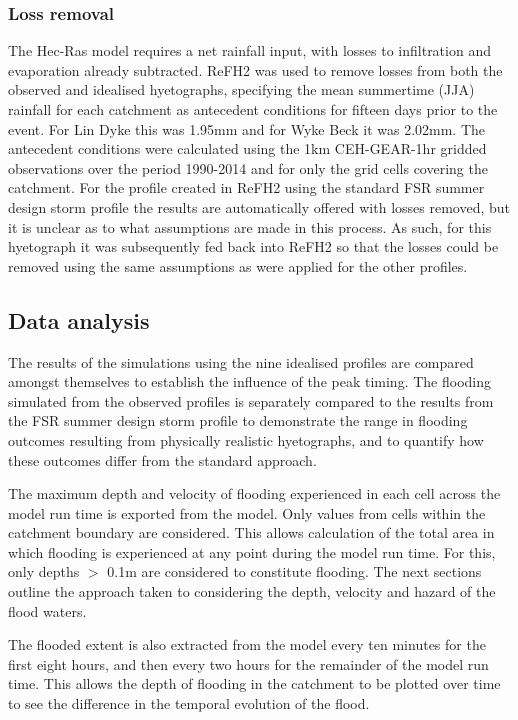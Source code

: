 \documentclass[APA,Times2COL]{WileyNJDv5}
\begin{document}
\subsubsection{Loss removal}
The Hec-Ras model requires a net rainfall input, with losses to infiltration and evaporation already subtracted. ReFH2 was used to remove losses from both the observed and idealised hyetographs, specifying the mean summertime (JJA) rainfall for each catchment as antecedent conditions for fifteen days prior to the event. For Lin Dyke this was 1.95mm and for Wyke Beck it was 2.02mm. The antecedent conditions were calculated using the 1km CEH-GEAR-1hr gridded observations \citep{lewis2019gridded} over the period 1990-2014 and for only the grid cells covering the catchment. For the profile created in ReFH2 using the standard FSR summer design storm profile the results are automatically offered with losses removed, but it is unclear as to what assumptions are made in this process. As such, for this hyetograph it was subsequently fed back into ReFH2 so that the losses could be removed using the same assumptions as were applied for the other profiles. 

\subsection{Data analysis}\label{subsec:model:data_analysis}
The results of the simulations using the nine idealised profiles are compared amongst themselves to establish the influence of the peak timing. The flooding simulated from the observed profiles is separately compared to the results from the FSR summer design storm profile to demonstrate the range in flooding outcomes resulting from physically realistic hyetographs, and to quantify how these outcomes differ from the standard approach. 

The maximum depth and velocity of flooding experienced in each cell across the model run time is exported from the model. Only values from cells within the catchment boundary are considered. This allows calculation of the total area in which flooding is experienced at any point during the model run time. For this, only depths $>$ 0.1m are considered to constitute flooding. The next sections outline the approach taken to considering the depth, velocity and hazard of the flood waters.

The flooded extent is also extracted from the model every ten minutes for the first eight hours, and then every two hours for the remainder of the model run time. This allows the depth of flooding in the catchment to be plotted over time to see the difference in the temporal evolution of the flood.  
\end{document}
